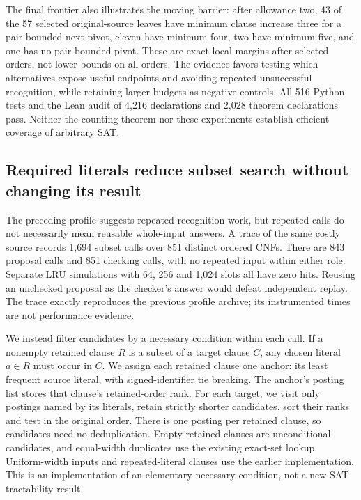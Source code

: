 \documentclass[11pt,a4paper]{article}
\numberwithin{equation}{section}
\theoremstyle{plain}
\theoremstyle{definition}
\theoremstyle{remark}
\begin{document}
The final frontier also illustrates the moving barrier: after allowance two, 43 of the 57 selected original-source leaves have minimum clause increase three for a pair-bounded next pivot, eleven have minimum four, two have minimum five, and one has no pair-bounded pivot. These are exact local margins after selected orders, not lower bounds on all orders. The evidence favors testing which alternatives expose useful endpoints and avoiding repeated unsuccessful recognition, while retaining larger budgets as negative controls. All 516 Python tests and the Lean audit of 4,216 declarations and 2,028 theorem declarations pass. Neither the counting theorem nor these experiments establish efficient coverage of arbitrary SAT.

\subsection{Required literals reduce subset search without changing its result}
\label{sec:anchored-subsets}

The preceding profile suggests repeated recognition work, but repeated calls do not necessarily mean reusable whole-input answers. A trace of the same costly source records 1,694 subset calls over 851 distinct ordered CNFs. There are 843 proposal calls and 851 checking calls, with no repeated input within either role. Separate LRU simulations with 64, 256 and 1,024 slots all have zero hits. Reusing an unchecked proposal as the checker's answer would defeat independent replay. The trace exactly reproduces the previous profile archive; its instrumented times are not performance evidence.

We instead filter candidates by a necessary condition within each call. If a nonempty retained clause $R$ is a subset of a target clause $C$, any chosen literal $a\in R$ must occur in $C$. We assign each retained clause one anchor: its least frequent source literal, with signed-identifier tie breaking. The anchor's posting list stores that clause's retained-order rank. For each target, we visit only postings named by its literals, retain strictly shorter candidates, sort their ranks and test in the original order. There is one posting per retained clause, so candidates need no deduplication. Empty retained clauses are unconditional candidates, and equal-width duplicates use the existing exact-set lookup. Uniform-width inputs and repeated-literal clauses use the earlier implementation. This is an implementation of an elementary necessary condition, not a new SAT tractability result.
\end{document}
